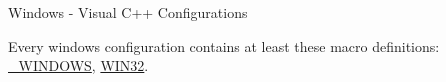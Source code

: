 \begin{section}{Windows - Visual C++ Configurations}

\newlength{\cdspcfgheading}
\setlength{\cdspcfgheading}{30mm}
\newlength{\cdspcfgtext}
\setlength{\cdspcfgtext}{\textwidth}
\addtolength{\cdspcfgtext}{-\cdspcfgheading}
\addtolength{\cdspcfgtext}{-\tabcolsep}
\addtolength{\cdspcfgtext}{-\tabcolsep}

\newcommand{\begindspconfigs}[1]{
	\begin{subsection}{#1}
	\begin{longtable}{p{\cdspcfgheading}@{}p{\cdspcfgtext}}
}
\newcommand{\adddspconfig}[4]{\hypertarget{cfg:#1}{}\\*
	\multicolumn{2}{l}{\textbf{#1}}\\*
	\textit{Target:}&#2\\*
	\textit{Description:}&#3\\*
	\textit{Defines used:}&#4\\
}
\newcommand{\termdspconfigs}[0]{
	\end{longtable}
	\end{subsection}
}

Every windows configuration contains at least these macro definitions: \hyperlink{def:_WINDOWS}{\_WINDOWS}, \hyperlink{def:WIN32}{WIN32}.


\end{section}
